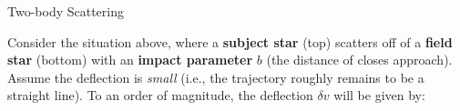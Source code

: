 \documentclass[letterpaper,landscape]{slides}
\begin{document}
\begin{slide}
\begin{center}
{\large \color{red} Two-body Scattering }
\end{center}

\begin{center}
\vskip -0.0in
\end{center}

Consider the situation above, where a {\bf subject star} (top) scatters off
of a {\bf field star} (bottom) with an {\bf impact parameter} $b$ (the
distance of closes approach).  Assume
the deflection is {\em small} (i.e., the trajectory roughly remains to be a
straight line).  To an order of magnitude, the deflection $\delta v$ will be
given by:


\vfill
\end{slide}
\end{document}
